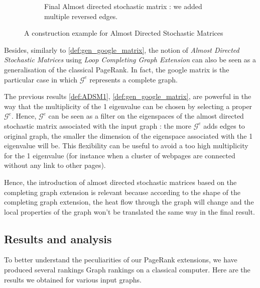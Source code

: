 \documentclass[sn-mathphys]{sn-jnl}%
\theoremstyle{thmstyleone}%
\theoremstyle{thmstyletwo}%
\theoremstyle{thmstylethree}%
\begin{document}
\begin{figure}
\begin{subfigure}{0.45\textwidth}
{}
\caption{Final Almost directed stochastic matrix : we added multiple reversed edges.}
\end{subfigure}
\caption{A construction example for Almost Directed Stochastic Matrices}
\label{fig:ADSM_construction}
\end{figure}

Besides, similarly to \ref{def:gen_google_matrix}, the notion of
\textit{Almost Directed Stochastic Matrices} using \textit{Loop
  Completing Graph Extension} can also be seen as a generalisation of
the classical PageRank. In fact, the google matrix is the particular
case in which $\mathcal{G}^e$ represents a complete graph.

The previous results \ref{def:ADSM1}, \ref{def:gen_google_matrix}, are
powerful in the way that the multiplicity of the 1 eigenvalue can be
chosen by selecting a proper $\mathcal{G}^e$. Hence, $\mathcal{G}^{e}$
can be seen as a filter on the eigenspaces of the almost directed
stochastic matrix associated with the input graph : the more
$\mathcal{G}^{e}$ adds edges to original graph, the smaller the
dimension of the eigenspace associated with the 1 eigenvalue will be.
This flexibility can be useful to avoid a too high multiplicity for
the 1 eigenvalue (for instance when a cluster of webpages are
connected without any link to other pages).

Hence, the introduction of almost directed stochastic matrices based
on the completing graph extension is relevant because according to the
shape of the completing graph extension, the heat flow through the
graph will change and the local properties of the graph won't be
translated the same way in the final result.

\subsection{Results and analysis}
\label{sec:results}

To better understand the peculiarities of our PageRank extensions, we
have produced several rankings Graph rankings on a classical
computer. Here are the results we obtained for various input graphs.
\end{document}
